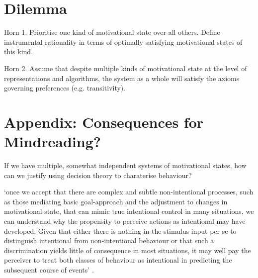 \documentclass[12pt]{extarticle}
\begin{document}
\begin{multicols*}{3}
\section{Dilemma}

Horn 1. Prioritise one kind of motivational state over all others. Define instrumental rationality in terms of optimally satisfying motivational states of this kind.

Horn 2. Assume that despite multiple kinds of motivational state at the level of representations and algorithms, the system as a whole will satisfy the axioms governing preferences (e.g. transitivity).

\section{Appendix: Consequences for Mindreading?}
If we have multiple, somewhat independent systems of motivational states,
how can we justify using decision theory to charaterise behaviour?

‘once we accept that there are complex and subtle non-intentional processes, such as those mediating
basic goal-approach and the adjustment to changes in motivational state, that can mimic true
intentional control in many situations, we can understand why the propensity to perceive actions as
intentional may have developed. Given that either there is nothing in the stimulus input per se to
distinguish intentional from non-intentional behaviour or that such a discrimination yields little of
consequence in most situations, it may well pay the perceiver to treat both classes of behaviour as
intentional in predicting the subsequent course of events’
\citep[p.~102]{heyes:1990_intentionality}.
 
    

\vfill







\footnotesize


\end{multicols*}
\end{document}
